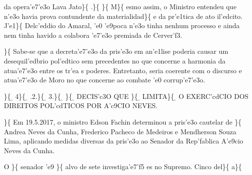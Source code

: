 da opera'e7'e3o Lava Jato\}\{\rtlch{}  \ltrch{}
 .\}\{\rtlch{}  \ltrch{}
 \}\{\rtlch{}  \ltrch{}
 M\}\{\rtlch{}  \ltrch{}
 esmo assim, o Ministro entendeu que
n'e3o havia prova contundente da materialidad\}\{ \rtlch{} 
\ltrch{}  e da pr'e1tica de ato il'edcito.
J'e1\}\{\rtlch{}  \ltrch{} 
Delc'eddio do Amaral, 'e0 'e9poca n'e3o tinha nenhum processo e ainda
nem tinha havido a colabora 'e7'e3o premiada de Cerver'f3.
\par \}\{\rtlch{}  \ltrch{}  Sabe-se que a
decreta'e7'e3o da pris'e3o em an'e1lise poderia causar um
desequil'edbrio pol'edtico sem precedentes no que concerne a harmonia da
atua'e7'e3o entre os tr'ea s poderes. Entretanto, seria coerente com o
discurso e atua'e7'e3o de Moro no que concerne ao combate 'e0
corrup'e7'e3o. \par \}\{\rtlch{} \ab{} \ltrch{}
\b{} 4\}\{\rtlch{} \ab{} \ltrch{}
\b{} .2.\}\{\rtlch{} \ab{}
\ltrch{} \b{} 3.\}\{\rtlch{} \ab{}
\ltrch{} \b{} \}\{\rtlch{}
\ab{} \ltrch{} \b{} DECIS'c3O QUE
\}\{\rtlch{} \ab{} \ltrch{} \b{}
LIMITA\}\{\rtlch{} \ab{} \ltrch{} \b{} O
EXERC'cdCIO DOS DIREITOS POL'cdTICOS POR A'c9CIO NEVES.
\par \}\{\rtlch{}  \ltrch{}
 Em
19.5.2017, o ministro Edson Fachin determinou a pris'e3o cautelar de
\}\{\rtlch{}  \ltrch{}  Andrea Neves da Cunha,
Frederico Pacheco de Medeiros e Mendherson Souza Lima, aplicando medidas
diversas da pris'e3o ao Senador da Rep'fablica A'e9cio Neves da Cunha.
\par O \}\{\rtlch{}  \ltrch{}
senador 'e9 \}\{\rtlch{}  \ltrch{}
alvo de sete investiga'e7'f5 es no Supremo. Cinco del\}\{\rtlch{}
 \ltrch{}
a\}\{\rtlch{}  \ltrch{}
